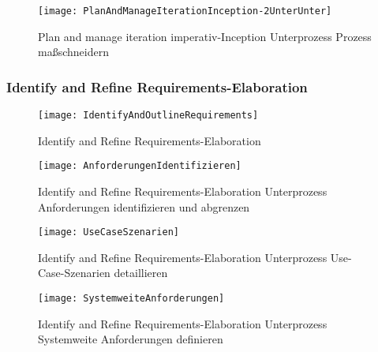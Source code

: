 \begin{figure}[!htbp]
\begin{center}
  \texttt{[image: PlanAndManageIterationInception-2UnterUnter]} %
  \caption{Plan and manage iteration imperativ-Inception Unterprozess Prozess maßschneidern}
  \label{fig:PlanAndManageIterationInception-2UnterUnter}
\end{center}
\end{figure}


\subsubsection{Identify and Refine Requirements-Elaboration}

\begin{figure}[[!htbp]
\begin{center}
  \texttt{[image: IdentifyAndOutlineRequirements]} %
  \caption{Identify and Refine Requirements-Elaboration}
  \label{fig:IdentifyAndOutlineRequirements}
\end{center}
\end{figure}



\begin{figure}[!htbp]
\begin{center}
  \texttt{[image: AnforderungenIdentifizieren]} %
  \caption{Identify and Refine Requirements-Elaboration Unterprozess Anforderungen identifizieren und abgrenzen}
  \label{fig:AnforderungenIdentifizieren}
\end{center}
\end{figure}


\begin{figure}[!htbp]
\begin{center}
  \texttt{[image: UseCaseSzenarien]} %
  \caption{Identify and Refine Requirements-Elaboration Unterprozess Use-Case-Szenarien detaillieren}
  \label{fig:UseCaseSzenarien}
\end{center}
\end{figure}


\begin{figure}[[!htbp]
\begin{center}
  \texttt{[image: SystemweiteAnforderungen]} %
  \caption{Identify and Refine Requirements-Elaboration Unterprozess Systemweite Anforderungen definieren}
  \label{fig:SystemweiteAnforderungen}
\end{center}
\end{figure}

